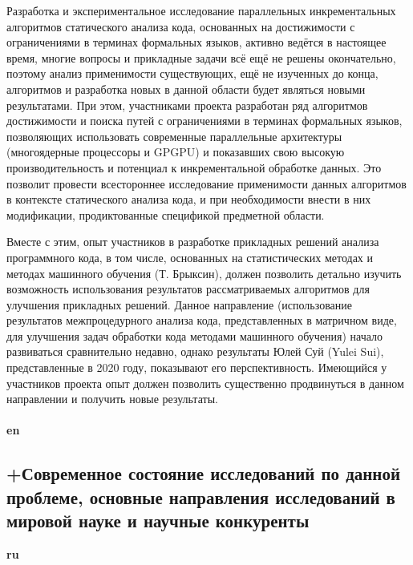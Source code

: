 \documentclass[12pt]{article}  %
\theoremstyle{remark}
\begin{document}
Разработка и экспериментальное исследование параллельных инкрементальных алгоритмов статического анализа кода, основанных на достижимости с ограничениями в терминах формальных языков, активно ведётся в настоящее время, многие вопросы и прикладные задачи всё ещё не решены окончательно, поэтому анализ применимости существующих, ещё не изученных до конца, алгоритмов и разработка новых в данной области будет являться новыми результатами. При этом, участниками проекта разработан ряд алгоритмов достижимости и поиска путей с ограничениями в терминах формальных языков, позволяющих использовать современные параллельные архитектуры (многоядерные процессоры и GPGPU) и показавших свою высокую производительность и потенциал к инкрементальной обработке данных. Это позволит провести всестороннее исследование применимости данных алгоритмов в контексте статического анализа кода, и при необходимости внести в них модификации, продиктованные спецификой предметной области. 

Вместе с этим, опыт участников в разработке прикладных решений анализа программного кода, в том числе, основанных на статистических методах и методах машинного обучения (Т. Брыксин), должен позволить детально изучить возможность использования результатов рассматриваемых алгоритмов для улучшения прикладных решений. Данное направление (использование результатов межпроцедурного анализа кода, представленных в матричном виде, для улучшения задач обработки кода методами машинного обучения) начало развиваться сравнительно недавно, однако результаты Юлей Суй (Yulei Sui), представленные в 2020 году, показывают его перспективность. Имеющийся у участников проекта опыт должен позволить существенно продвинуться в данном направлении и получить новые результаты.
\\
\\
\textbf{en}\\



\subsection{+Современное состояние исследований по данной проблеме, основные направления исследований в мировой науке и научные конкуренты}

\textbf{ru}\\
\end{document}
